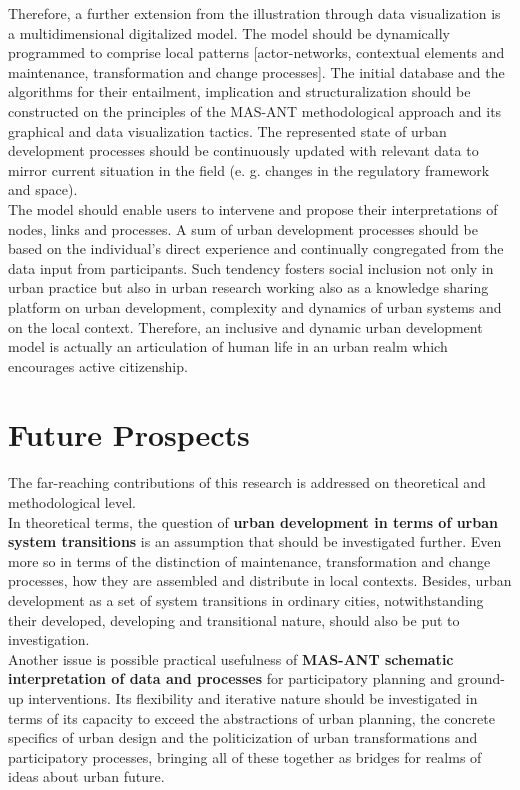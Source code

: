\documentclass[11pt]{report}
\begin{document}
{{{Therefore, a further extension from the illustration through data visualization is a multidimensional digitalized model.
The model should be dynamically programmed to comprise local patterns [actor-networks, contextual elements and maintenance, transformation and change processes].
The initial database and the algorithms for their entailment, implication and structuralization should be constructed on the principles of the MAS-ANT methodological approach and its graphical and data visualization tactics.
The represented state of urban development processes should be continuously updated with relevant data to mirror current situation in the field (e. g. changes in the regulatory framework and space).
\\

The model should enable users to intervene and propose their interpretations of nodes, links and processes.
A sum of urban development processes should be based on the individual's direct experience and continually congregated from the data input from participants.
Such tendency fosters social inclusion not only in urban practice but also in urban research working also as a knowledge sharing platform on urban development, complexity and dynamics of urban systems and on the local context.
Therefore, an inclusive and dynamic urban development model is actually an articulation of human life in an urban realm which encourages active citizenship.

\section{Future Prospects}

The far-reaching contributions of this research is addressed on theoretical and methodological level. 
\\
In theoretical terms, the question of \textbf{urban development in terms of urban system transitions} is an assumption that should be investigated further. Even more so in terms of the distinction of maintenance, transformation and change processes, how they are assembled and distribute in local contexts.
Besides, urban development as a set of system transitions in ordinary cities, notwithstanding their developed, developing and transitional nature, should also be put to investigation. 
\\

Another issue is possible practical usefulness of \textbf{MAS-ANT schematic interpretation of data and processes} for participatory planning and ground-up interventions.
Its flexibility and iterative nature should be investigated in terms of its capacity to exceed the abstractions of urban planning, the concrete specifics of urban design and the politicization of urban transformations and participatory processes, bringing all of these together as bridges for realms of ideas about urban future.
\\

}}}
\end{document}
